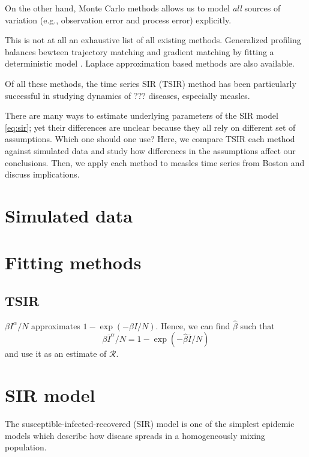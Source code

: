 \documentclass{article}
\begin{document}
On the other hand, Monte Carlo methods allows us to model \emph{all} sources of variation (e.g., observation error and process error) explicitly.



This is not at all an exhaustive list of all existing methods.
Generalized profiling balances bewteen trajectory matching and gradient matching by fitting a deterministic model  \citep{hooker2010parameterizing}.
Laplace approximation based methods are also available.

Of all these methods, the time series SIR (TSIR) method has been particularly successful in studying dynamics of ??? diseases, especially measles.




There are many ways to estimate underlying parameters of the SIR model \ref{eq:sir};
yet their differences are unclear because they all rely on different set of assumptions.
Which one should one use?
Here, we compare TSIR each method against simulated data and study how differences in the assumptions affect our conclusions.
Then, we apply each method to measles time series from Boston and discuss implications.

\pagebreak

\section{Simulated data}

\pagebreak


\section{Fitting methods}

\subsection{TSIR}

$\beta I^\alpha/N$ approximates $1 - \exp(-\beta I/N)$.
Hence, we can find $\hat\beta$ such that 
$$
\beta \bar{I}^\alpha/N = 1 - \exp(-\hat\beta \bar{I}/N)
$$
and use it as an estimate of $\mathcal R$.



\section{SIR model}

The susceptible-infected-recovered (SIR) model is one of the simplest epidemic models which describe how disease spreads in a homogeneously mixing population.
\end{document}
